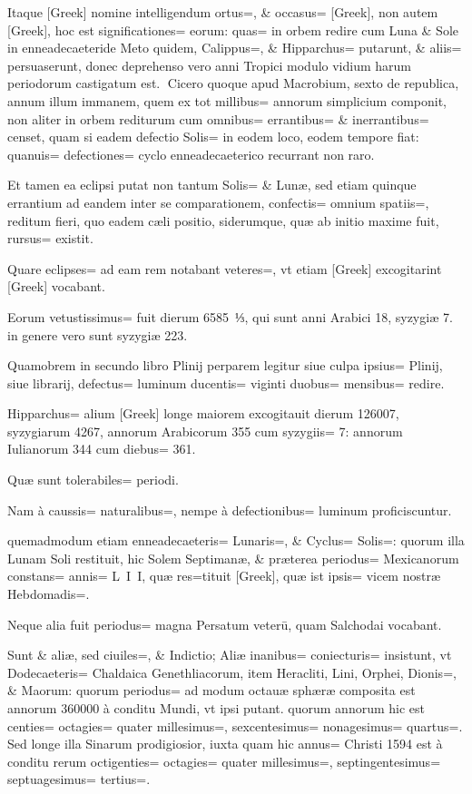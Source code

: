 \begin{parnumbers}

Itaque [Greek] nomine intelligendum ortus=, \& occasus= [Greek],  non autem [Greek], hoc est significationes= eorum: quas= in orbem redire cum Luna \& Sole in enneadecaeteride Meto quidem, Calippus=, \& Hipparchus= putarunt, \& aliis= persuaserunt, donec deprehenso vero anni Tropici modulo vidium harum periodorum castigatum est.
Cicero quoque apud Macrobium, sexto de republica, annum illum immanem, quem ex tot millibus= annorum simplicium componit, non aliter in orbem rediturum cum omnibus= errantibus= \& inerrantibus= censet, quam si eadem defectio Solis= in eodem loco, eodem tempore fiat: quanuis= defectiones= cyclo enneadecaeterico recurrant non raro.

Et tamen ea eclipsi putat non tantum Solis= \& Lunæ, sed etiam quinque errantium ad eandem  inter se comparationem, confectis= omnium spatiis=, reditum fieri, quo eadem cæli positio, siderumque, quæ ab initio maxime fuit, rursus= existit.

Quare eclipses= ad eam rem notabant veteres=, vt etiam [Greek] excogitarint [Greek] vocabant.

Eorum vetustissimus= fuit dierum 6585 ⅓, qui sunt anni Arabici 18, syzygiæ 7. in genere vero sunt syzygiæ 223.

Quamobrem in secundo libro Plinij perparem legitur siue culpa ipsius= Plinij, siue librarij, defectus= luminum ducentis= viginti duobus= mensibus= redire.

Hipparchus= alium [Greek] longe maiorem excogitauit dierum 126007, syzygiarum 4267, annorum Arabicorum 355 cum syzygiis= 7: annorum Iulianorum 344 cum diebus= 361.

Quæ sunt tolerabiles= periodi.

Nam à caussis= naturalibus=,  nempe à defectionibus= luminum proficiscuntur.

quemadmodum etiam enneadecaeteris= Lunaris=, \& Cyclus= Solis=: quorum illa Lunam Soli restituit, hic Solem Septimanæ, \& præterea periodus= Mexicanorum constans= annis= L I I, quæ res=tituit [Greek], quæ ist ipsis= vicem nostræ Hebdomadis=.

Neque alia fuit periodus= magna Persatum veterū, quam Salchodai vocabant.

Sunt \& aliæ, sed ciuiles=, \& Indictio; Aliæ inanibus= coniecturis= insistunt, vt Dodecaeteris= Chaldaica Genethliacorum, item Heracliti, Lini, Orphei, Dionis=, \& Maorum: quorum periodus= ad modum octauæ sphæræ composita est annorum 360000 à conditu Mundi, vt ipsi putant. quorum annorum hic est centies= octagies= quater millesimus=, sexcentesimus= nonagesimus= quartus=.  Sed longe illa Sinarum prodigiosior, iuxta quam hic annus= Christi 1594 est à conditu rerum octigenties= octagies= quater millesimus=, septingentesimus= septuagesimus= tertius=.


\end{parnumbers}
